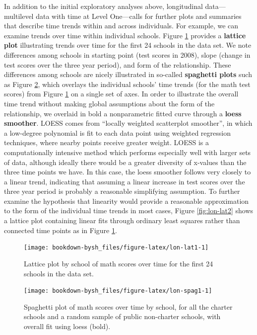 \documentclass[
]{krantz}
\begin{document}
In addition to the initial exploratory analyses above, longitudinal data---multilevel data with time at Level One---calls for further plots and summaries that describe time trends within and across individuals. For example, we can examine trends over time within individual schools. Figure \ref{fig:lon-lat1} provides a \textbf{lattice plot}  illustrating trends over time for the first 24 schools in the data set. We note differences among schools in starting point (test scores in 2008), slope (change in test scores over the three year period), and form of the relationship. These differences among schools are nicely illustrated in so-called \textbf{spaghetti plots}  such as Figure \ref{fig:lon-spag1}, which overlays the individual schools' time trends (for the math test scores) from Figure \ref{fig:lon-lat1} on a single set of axes. In order to illustrate the overall time trend without making global assumptions about the form of the relationship, we overlaid in bold a nonparametric fitted curve through a \textbf{loess smoother}.  LOESS comes from ``locally weighted scatterplot smoother'', in which a low-degree polynomial is fit to each data point using weighted regression techniques, where nearby points receive greater weight. LOESS is a computationally intensive method which performs especially well with larger sets of data, although ideally there would be a greater diversity of x-values than the three time points we have. In this case, the loess smoother follows very closely to a linear trend, indicating that assuming a linear increase in test scores over the three year period is probably a reasonable simplifying assumption. To further examine the hypothesis that linearity would provide a reasonable approximation to the form of the individual time trends in most cases, Figure \ref{fig:lon-lat2} shows a lattice plot containing linear fits through ordinary least squares rather than connected time points as in Figure \ref{fig:lon-lat1}.

\begin{figure}

{\centering \texttt{[image: bookdown-bysh\_files/figure-latex/lon-lat1-1]} 

}

\caption{Lattice plot by school of math scores over time for the first 24 schools in the data set.}\label{fig:lon-lat1}
\end{figure}

\begin{figure}

{\centering \texttt{[image: bookdown-bysh\_files/figure-latex/lon-spag1-1]} 

}

\caption{ Spaghetti plot of math scores over time by school, for all the charter schools and a random sample of public non-charter schools, with overall fit using loess (bold).}\label{fig:lon-spag1}
\end{figure}
\end{document}
